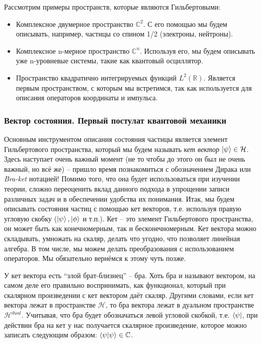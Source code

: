 Рассмотрим примеры пространств, которые являются Гильбертовыми: 
\begin{itemize}
    \item Комплексное двумерное пространство $\mathbb{C}^2$. С его помощью мы будем описывать, например, частицы со спином 1/2 (электроны, нейтроны).
    \item Комплексное n-мерное пространство $\mathbb{C}^n$. Используя его, мы будем описывать уже n-уровневые системы, такие как квантовый осциллятор.
    \item Пространство квадратично интегрируемых функций $L^2(\mathbb{R})$. Является первым пространством, с которым мы встретимся, так как используется для описания операторов координаты и импульса.
\end{itemize}

\subsubsection*{Вектор состояния. Первый постулат квантовой механики}
\hspace{1em} Основным инструментом описания состояния частицы является элемент Гильбертового пространства, который мы будем называть \textit{кет вектор} $\ket{\psi} \in \mathcal{H}$. Здесь наступает очень важный момент (не то чтобы до этого он был не очень важный, но всё же) -- пришло время познакомиться с обозначением Дирака или \textit{Bra-ket} нотацией! Помимо того, что она будет использоваться при изучении теории, сложно переоценить вклад данного подхода в упрощении записи различных задач и в обеспечении удобства их понимания. Итак, мы будем описывать состояния частиц с помощью кет векторов, т.е. используя правую угловую скобку ($\ket{\psi}, \ket{\phi}$ и т.п.). Кет -- это элемент Гильбертового пространства, он может быть как конечномерным, так и бесконечномерным. Кет вектора можно складывать, умножать на скаляр, делать что угодно, что позволяет линейная алгебра. В том числе, мы можем делать преобразования с использованием операторов. Мы обязательно вернёмся к этому чуть позже. 

У кет вектора есть ``злой брат-близнец'' -- бра. Хоть бра и называют вектором, на самом деле его правильно воспринимать, как функционал, который при скалярном произведении с кет вектором даёт скаляр. Другими словами, если кет вектора лежат в пространстве $\mathcal{H}$, то бра вектора лежат в дуальном пространстве $\mathcal{H}^{dual}$. Учитывая, что бра будет обозначаться левой угловой скобкой, т.е. $\bra{\psi}$, при действии бра на кет у нас получается скалярное произведение, которое можно записать следующим образом: $\bra{\psi}\ket{\psi} \in \mathbb{C}$. 

